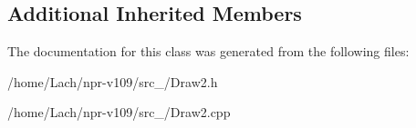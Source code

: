 \subsection*{Additional Inherited Members}


The documentation for this class was generated from the following files\+:\begin{DoxyCompactItemize}
\item 
/home/\+Lach/npr-\/v109/src\+\_/Draw2.\+h\item 
/home/\+Lach/npr-\/v109/src\+\_/Draw2.\+cpp\end{DoxyCompactItemize}
